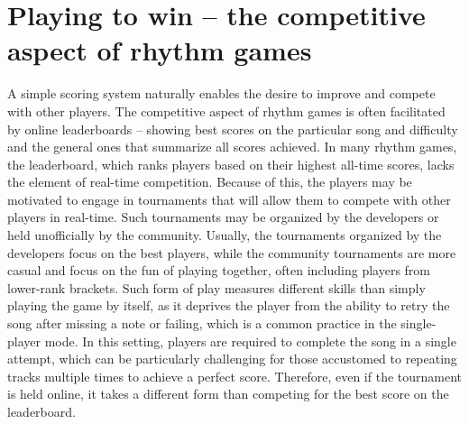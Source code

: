 \section{Playing to win -- the competitive aspect of rhythm games}
A simple scoring system naturally enables the desire to improve and compete with other players. The competitive aspect of rhythm games is often facilitated by online leaderboards -- showing best scores on the particular song and difficulty and the general ones that summarize all scores achieved. In many rhythm games, the leaderboard, which ranks players based on their highest all-time scores, lacks the element of real-time competition. Because of this, the players may be motivated to engage in tournaments that will allow them to compete with other players in real-time. Such tournaments may be organized by the developers or held unofficially by the community. Usually, the tournaments organized by the developers focus on the best players, while the community tournaments are more casual and focus on the fun of playing together, often including players from lower-rank brackets. Such form of play measures different skills than simply playing the game by itself, as it deprives the player from the ability to retry the song after missing a note or failing, which is a common practice in the single-player mode. In this setting, players are required to complete the song in a single attempt, which can be particularly challenging for those accustomed to repeating tracks multiple times to achieve a perfect score. Therefore, even if the tournament is held online, it takes a different form than competing for the best score on the leaderboard.

